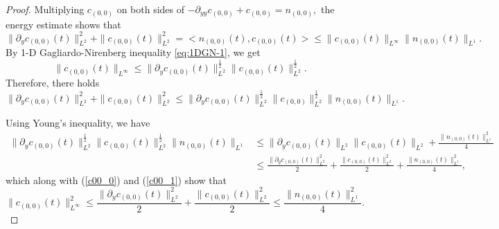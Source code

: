 \documentclass[12pt, reqno]{amsart}
\numberwithin{equation}{section}
\begin{document}
	\begin{proof}
		Multiplying $c_{(0,0)}$ on both sides of $-\partial_{yy} c_{(0,0 )}+c_{(0,0 )}=n_{(0,0)},$ the energy estimate shows that 
		\begin{equation*}
			\|\partial_{y} c_{(0,0 )}(t)\|^2_{L^2}
			+\|c_{(0,0 )}(t)\|_{L^2}^2=<n_{(0,0)}(t),c_{(0,0)}(t)>
			\leq \|c_{(0,0)}(t)\|_{L^{\infty}}\|n_{(0,0)}(t)\|_{L^1}.
		\end{equation*}
		By 1-D Gagliardo-Nirenberg inequality \eqref{eq:1DGN-1}, we
		get  
		\begin{equation}\label{c00_0}
			\|c_{(0,0)}(t)\|_{L^{\infty}}\leq 
			\|\partial_yc_{(0,0)}(t)\|_{L^{2}}^{\frac12}
			\|c_{(0,0)}(t)\|_{L^{2}}^{\frac12}.
		\end{equation}
		Therefore, there holds
		\begin{equation}\label{c00_1}
			\|\partial_{y} c_{(0,0 )}(t)\|^2_{L^2}
			+\|c_{(0,0 )}(t)\|_{L^2}^2
			\leq \|\partial_yc_{(0,0)}(t)\|_{L^{2}}^{\frac12}
			\|c_{(0,0)}\|_{L^{2}}^{\frac12}\|n_{(0,0)}(t)\|_{L^1}.
		\end{equation}
		
		Using Young's inequality, we have
		\begin{equation*}
			\begin{aligned}
				\|\partial_yc_{(0,0)}(t)\|_{L^{2}}^{\frac12}
				\|c_{(0,0)}(t)\|_{L^{2}}^{\frac12}\|n_{(0,0)}(t)\|_{L^1}
				&\leq \|\partial_yc_{(0,0)}(t)\|_{L^{2}}
				\|c_{(0,0)}(t)\|_{L^{2}}+
				\frac{\|n_{(0,0)}(t)\|^2_{L^1}}{4}\\
				&\leq \frac{\|\partial_yc_{(0,0)}(t)\|_{L^{2}}^2}{2}
				+\frac{\|c_{(0,0)}(t)\|_{L^{2}}^2}{2}+
				\frac{\|n_{(0,0)}(t)\|^2_{L^1}}{4},
			\end{aligned}
		\end{equation*}
		which along with (\ref{c00_0}) and (\ref{c00_1}) show that 
		\begin{equation*}
			\|c_{(0,0)}(t)\|^2_{L^{\infty}}\leq 
			\frac{	\|\partial_yc_{(0,0)}(t)\|_{L^{2}}^2}{2}+
			\frac{	\|c_{(0,0)}(t)\|_{L^{2}}^2}{2}\leq \frac{\|n_{(0,0)}(t)\|^2_{L^1}}{4}.
		\end{equation*}
		

\end{proof}
\end{document}
